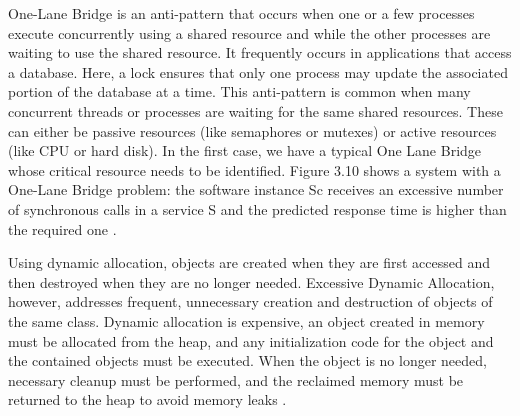\documentclass[espaco=umemeio,chapter=TITLE,twoside,openright]{abnt}
\begin{document}
One-Lane Bridge is an anti-pattern that occurs when one or a few processes execute concurrently using a shared resource and while the other processes are waiting to use the shared resource. It frequently occurs in applications that access a database. Here, a lock ensures that only one process may update the associated portion of the database at a time. This anti-pattern is common when many concurrent threads or processes are waiting for the same shared resources. These can either be passive resources (like semaphores or mutexes) or active resources (like CPU or hard disk). In the first case, we have a typical One Lane Bridge whose critical resource needs to be identified. Figure 3.10 shows a system with a One-Lane Bridge problem:  the software instance Sc receives an excessive number of synchronous calls in a service S and the predicted response time is higher than the required one \cite{Vetoio2011}.


Using dynamic allocation, objects are created when they are first accessed and then destroyed when they are no longer needed. Excessive Dynamic Allocation, however, addresses frequent, unnecessary creation and destruction of objects of the same class. Dynamic allocation is expensive, an object created in memory must be allocated from the heap, and any initialization code for the object and the contained objects must be executed. When the object is no longer needed, necessary cleanup must be performed, and the reclaimed memory must be returned to the heap to avoid memory leaks \cite{Smith2002} \cite{Smith2003}.
\end{document}
